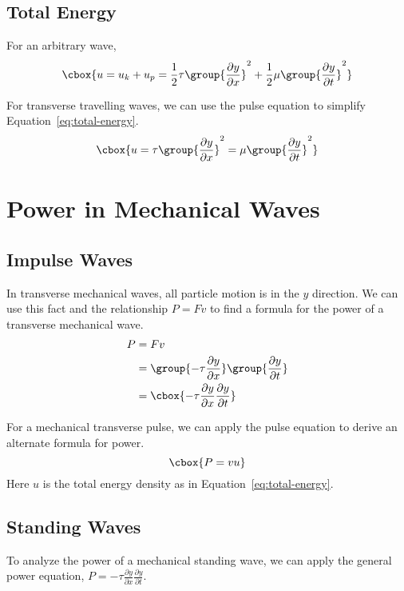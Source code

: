 \documentclass{hw}
\numberwithin{equation}{section}
\begin{document}
\subsection{Total Energy}
For an arbitrary wave, 
\begin{equation}\label{eq:total-energy}
\cbox{%
  u = u_k + u_p =
      \frac{1}{2} \tau \group{\frac{\partial y}{\partial x}}^2
    + \frac{1}{2} \mu \group{\frac{\partial y}{\partial t}}^2
}
\end{equation}

For transverse travelling waves, we can use the pulse equation to simplify
Equation~\ref{eq:total-energy}.
\begin{equation}
\cbox{%
  u = \tau \group{\frac{\partial y}{\partial x}}^2
    = \mu \group{\frac{\partial y}{\partial t}}^2
}
\end{equation}

\section{Power in Mechanical Waves}
\subsection{Impulse Waves}
In transverse mechanical waves, all particle motion is in the $y$ direction. We
can use this fact and the relationship $P = Fv$ to find a formula for the power
of a transverse mechanical wave.
\begin{align}
  P &= Fv \\
    &= \group{-\tau \frac{\partial y}{\partial x}} 
       \group{\frac{\partial y}{\partial t}} \\
    &= \cbox{%
      -\tau \frac{\partial y}{\partial x} \frac{\partial y}{\partial t}
    }
\end{align}

For a mechanical transverse pulse, we can apply the pulse equation to derive an
alternate formula for power.
\begin{equation}\label{eq:power-alternate}
\cbox{%
  P = vu
}
\end{equation}
Here $u$ is the total energy density as in Equation~\eqref{eq:total-energy}.

\subsection{Standing Waves}
To analyze the power of a mechanical standing wave, we can apply the general
power equation, 
  $P = -\tau \frac{\partial y}{\partial x} \frac{\partial y}{\partial t}$.
\end{document}
